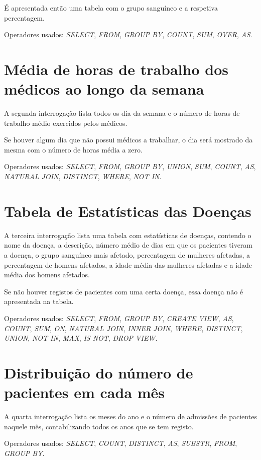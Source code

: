 \documentclass[article, a4paper, 12pt, oneside]{memoir}
\begin{document}
É apresentada então uma tabela com o grupo sanguíneo e a respetiva percentagem.

Operadores usados: \emph{SELECT}, \emph{FROM}, \emph{GROUP BY}, \emph{COUNT}, \emph{SUM}, \emph{OVER}, \emph{AS}.

\section{Média de horas de trabalho dos médicos ao longo da semana}
A segunda interrogação lista todos os dia da semana e o número de horas de trabalho médio exercidos pelos médicos.

Se houver algum dia que não possui médicos a trabalhar, o dia será mostrado da mesma com o número de horas média a zero.

Operadores usados: \emph{SELECT}, \emph{FROM}, \emph{GROUP BY}, \emph{UNION}, \emph{SUM}, \emph{COUNT}, \emph{AS}, \emph{NATURAL JOIN}, \emph{DISTINCT}, \emph{WHERE},  \emph{NOT IN}.

\section{Tabela de Estatísticas das Doenças}
A terceira interrogação lista uma tabela com estatísticas de doenças, contendo o nome da doença, a descrição, número médio de dias em que os pacientes tiveram a doença, o grupo sanguíneo mais afetado, percentagem de mulheres afetadas, a percentagem de homens afetados, a idade média das mulheres afetadas e a idade média dos homens afetados.

Se não houver registos de pacientes com uma certa doença, essa doença não é apresentada na tabela.

Operadores usados: \emph{SELECT}, \emph{FROM}, \emph{GROUP BY}, \emph{CREATE VIEW}, \emph{AS}, \emph{COUNT}, \emph{SUM}, \emph{ON}, \emph{NATURAL JOIN}, \emph{INNER JOIN}, \emph{WHERE}, \emph{DISTINCT}, \emph{UNION}, \emph{NOT IN}, \emph{MAX}, \emph{IS NOT}, \emph{DROP VIEW}.

\section{Distribuição do número de pacientes em cada mês}
A quarta interrogação lista os meses do ano e o número de admissões de pacientes naquele mês, contabilizando todos os anos que se tem registo.

Operadores usados: \emph{SELECT}, \emph{COUNT}, \emph{DISTINCT}, \emph{AS}, \emph{SUBSTR}, \emph{FROM}, \emph{GROUP BY}.
\end{document}
